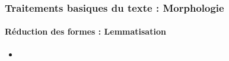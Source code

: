 \documentclass[xcolor=table]{beamer}
\begin{document}
\begin{frame}
\frametitle{Traitements basiques du texte : Morphologie}
\framesubtitle{Réduction des formes : Lemmatisation}

\begin{itemize}
	\item 
\end{itemize}

\end{frame}

\end{document}
